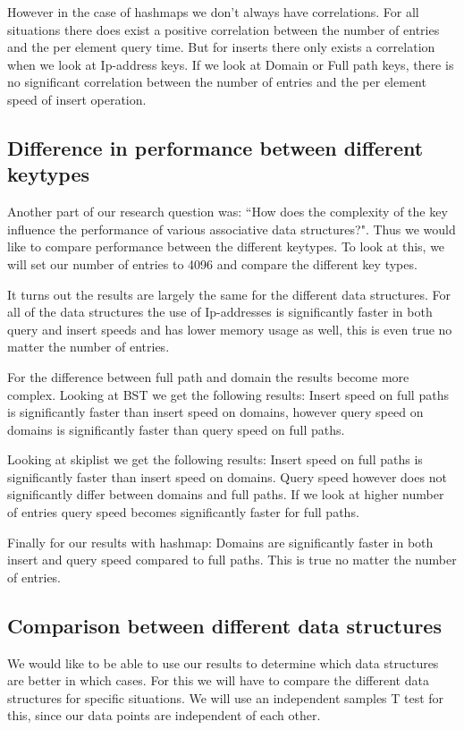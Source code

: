 \documentclass[12pt,a4paper]{article}
\begin{document}
    However in the case of hashmaps we don't always have correlations. For all situations there does exist a positive correlation
    between the number of entries and the per element query time. But for inserts there only exists a correlation when we 
    look at Ip-address keys. If we look at Domain or Full path keys, there is no significant correlation between the number of entries
    and the per element speed of insert operation. 

    \subsection{Difference in performance between different keytypes}
    Another part of our research question was: ``How does the complexity of the key influence the performance of 
    various associative data structures?". Thus we would like to compare performance between the different keytypes. 
    To look at this, we will set our number of entries to 4096 and compare the different key types.

    It turns out the results are largely the same for the different data structures. For all of the data structures the use of
    Ip-addresses is significantly faster in both query and insert speeds and has lower memory usage as well, this is even true
    no matter the number of entries. 

    For the difference between full path and domain the results become more complex. Looking at BST we get the following results:
    Insert speed on full paths is significantly faster than insert speed on domains, however query speed on domains is significantly faster
    than query speed on full paths. 

    Looking at skiplist we get the following results: Insert speed on full paths is significantly faster than insert speed on domains. Query
    speed however does not significantly differ between domains and full paths. If we look at higher number of entries query speed becomes 
    significantly faster for full paths. 

    Finally for our results with hashmap: Domains are significantly faster in both insert and query speed compared to full paths. 
    This is true no matter the number of entries.

    \subsection{Comparison between different data structures}
    We would like to be able to use our results to determine which data structures are better in which cases. 
    For this we will have to compare the different data structures for specific situations. We will use an independent
    samples T test for this, since our data points are independent of each other. 
\end{document}

